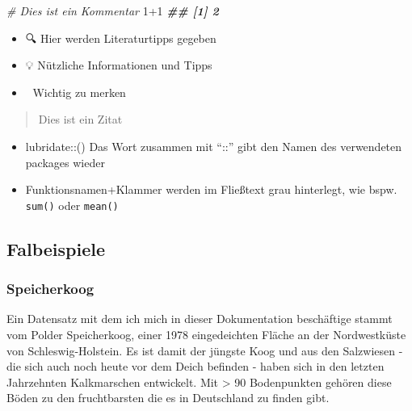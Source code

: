 \documentclass[
]{article}
\newenvironment{Shaded}{\begin{snugshade}}{\end{snugshade}}
\newcommand{\CommentTok}[1]{\textcolor[rgb]{0.56,0.35,0.01}{\textit{#1}}}
\newcommand{\DecValTok}[1]{\textcolor[rgb]{0.00,0.00,0.81}{#1}}
\newcommand{\DocumentationTok}[1]{\textcolor[rgb]{0.56,0.35,0.01}{\textbf{\textit{#1}}}}
\newcommand{\SpecialCharTok}[1]{\textcolor[rgb]{0.00,0.00,0.00}{#1}}
\begin{document}
\begin{Shaded}
\begin{Highlighting}[]
\CommentTok{\# Dies ist ein Kommentar }
\DecValTok{1}\SpecialCharTok{+}\DecValTok{1} 
\DocumentationTok{\#\# [1] 2}
\end{Highlighting}
\end{Shaded}

\begin{itemize}
\item
  🔍️ Hier werden Literaturtipps gegeben
\item
  💡 Nützliche Informationen und Tipps
\item
  🚨 Wichtig zu merken
\end{itemize}

\begin{quote}
Dies ist ein Zitat
\end{quote}

\begin{itemize}
\item
  lubridate::() Das Wort zusammen mit ``::'' gibt den Namen des verwendeten packages wieder
\item
  Funktionsnamen+Klammer werden im Fließtext grau hinterlegt, wie bspw. \texttt{sum()} oder \texttt{mean()}
\end{itemize}

\hypertarget{falbeispiele}{%
\subsection{Falbeispiele}\label{falbeispiele}}

\hypertarget{speicherkoog}{%
\subsubsection{Speicherkoog}\label{speicherkoog}}

Ein Datensatz mit dem ich mich in dieser Dokumentation beschäftige stammt vom Polder Speicherkoog, einer 1978 eingedeichten Fläche an der Nordwestküste von Schleswig-Holstein. Es ist damit der jüngste Koog und aus den Salzwiesen - die sich auch noch heute vor dem Deich befinden - haben sich in den letzten Jahrzehnten Kalkmarschen entwickelt. Mit \textgreater{} 90 Bodenpunkten gehören diese Böden zu den fruchtbarsten die es in Deutschland zu finden gibt.
\end{document}
